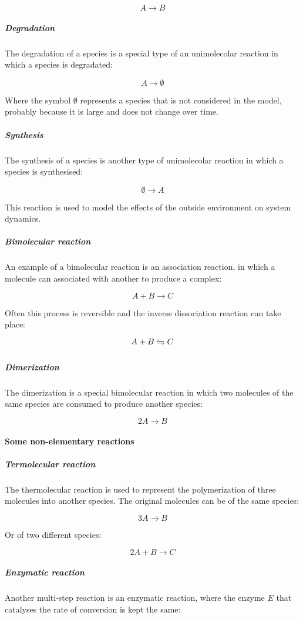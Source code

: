         $$A\rightarrow B$$

        \subparagraph{Degradation}
        The degradation of a species is a special type of an unimolecolar reaction in which a species is degradated:

        $$A\rightarrow\emptyset$$

        Where the symbol $\emptyset$ represents a species that is not considered in the model, probably because it is large and does not change over time.

        \subparagraph{Synthesis}
        The synthesis of a species is another type of unimolecolar reaction in which a species is synthesised:

        $$\emptyset\rightarrow A$$

        This reaction is used to model the effects of the outside environment on system dynamics.

        \subparagraph{Bimolecular reaction}
        An example of a bimolecular reaction is an association reaction, in which a molecule can associated with another to produce a complex:

        $$A+B\rightarrow C$$

        Often this process is reversible and the inverse dissociation reaction can take place:

        $$A+B\xleftrightharpoons[]{} C$$

        \subparagraph{Dimerization}
        The dimerization is a special bimolecular reaction in which two molecules of the same species are consumed to produce another species:

        $$2A\rightarrow B$$

      \paragraph{Some non-elementary reactions}

        \subparagraph{Termolecular reaction}
        The thermolecular reaction is used to represent the polymerization of three molecules into another species.
        The original molecules can be of the same species:

        $$3A\rightarrow B$$

        Or of two different species:

        $$2A +B\rightarrow C$$

        \subparagraph{Enzymatic reaction}
        Another multi-step reaction is an enzymatic reaction, where the enzyme $E$ that catalyses the rate of conversion is kept the same:

